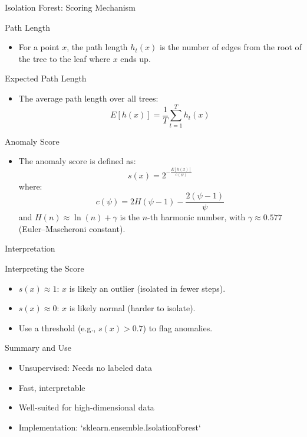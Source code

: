 \documentclass[aspectratio=169]{beamer}
\begin{document}
\begin{frame}[label={sec:orgc84093c}]{Isolation Forest: Scoring Mechanism}
\begin{block}{Path Length}
\begin{itemize}
\item For a point \(x\), the \alert{path length} \(h_t(x)\) is the number
of edges from the root of the tree to the leaf where \(x\) ends
up.
\end{itemize}
\end{block}

\begin{block}{Expected Path Length}
\begin{itemize}
\item The average path length over all trees:
\[
  E[h(x)] = \frac{1}{T} \sum_{t=1}^T h_t(x)
  \]
\end{itemize}
\end{block}

\begin{block}{Anomaly Score}
\begin{itemize}
\item The anomaly score is defined as:
\[
  s(x) = 2^{ - \frac{E[h(x)]}{c(\psi)} }
  \]
where:
\[
  c(\psi) = 2 H(\psi - 1) - \frac{2(\psi - 1)}{\psi}
  \]
and \(H(n) \approx \ln(n) + \gamma\) is the
\(n\)-th harmonic number,
with \(\gamma \approx 0.577\) (Euler–Mascheroni constant).
\end{itemize}
\end{block}
\end{frame}

\begin{frame}[label={sec:org54829f2}]{Interpretation}
\begin{block}{Interpreting the Score}
\begin{itemize}
\item \(s(x) \approx 1\): \(x\) is likely an \alert{outlier} (isolated in
fewer steps).
\item \(s(x) \approx 0\): \(x\) is likely \alert{normal} (harder to isolate).
\item Use a threshold (e.g., \(s(x) > 0.7\)) to flag anomalies.
\end{itemize}
\end{block}
\end{frame}


\begin{frame}[label={sec:org73c7a5d}]{Summary and Use}
\begin{itemize}
\item Unsupervised: Needs no labeled data
\item Fast, interpretable
\item Well-suited for high-dimensional data
\item Implementation: `sklearn.ensemble.IsolationForest`
\end{itemize}
\end{frame}
\end{document}
